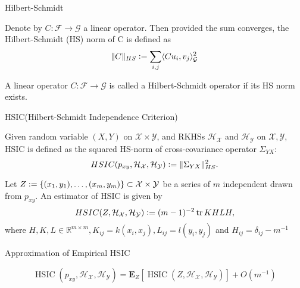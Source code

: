 \begin{frame}{Hilbert-Schmidt}
\begin{definition}
Denote by $C:\mathcal F\rightarrow \mathcal G$ a linear operator. Then provided the sum converges, the Hilbert-Schmidt (HS) norm of  C is defined as 
\begin{equation}
	\|C\|_{HS}\vcentcolon=\sum_{i,j}\langle Cu_i, v_j\rangle^2_{\mathcal G}
\end{equation}
\end{definition}

\begin{definition}
A linear operator $C:\mathcal F\rightarrow \mathcal G$ is called a Hilbert-Schmidt operator if its HS norm exists.
\end{definition}


\end{frame}


\begin{frame}{HSIC(Hilbert-Schmidt Independence Criterion)}
	\begin{definition}[HSIC]
	Given random variable $(X, Y)$ on $\mathcal X\times \mathcal Y$, and RKHSs $\mathcal H_{\mathcal X}$ and $\mathcal H_{\mathcal Y}$ on $\mathcal X, \mathcal Y$,
	HSIC is defined as the squared HS-norm of cross-covariance operator $\Sigma_{YX}$:
	\begin{equation}
		HSIC(p_{xy}, \mathcal{H_{\mathcal X}}, \mathcal{H_{\mathcal Y}}) \vcentcolon= \|\Sigma_{YX} \|_{HS}^2.
	\end{equation}
	\end{definition}
	
\begin{definition}
Let $Z\vcentcolon= \{(x_1, y_1),\dots,(x_m,y_m)\}\subset \mathcal X\times \mathcal Y$ be a series of $m$ independent drawn from $p_{xy}$. 
An estimator of HSIC is given by 
\begin{equation}
	HSIC(Z, \mathcal H_{\mathcal X}, \mathcal H_{\mathcal Y}) \vcentcolon= (m-1)^{-2}\operatorname{tr} KHLH,
\end{equation}
where $H, K, L\in \mathbb R^{m\times m}, K_{ij}=k(x_i,x_j), L_{ij}=l(y_i, y_j)$ and $H_{ij}=\delta_{ij}-m^{-1}$
\end{definition}



\end{frame}

\begin{frame}{Approximation of Empirical HSIC}
	
	
\begin{theorem}
\begin{equation}
	\operatorname{HSIC}\left(p_{x y}, \mathcal{H_{\mathcal X}}, \mathcal{H_{\mathcal Y}}\right)=\mathbf{E}_{Z}[\operatorname{HSIC}(Z, \mathcal{H_{\mathcal X}}, \mathcal{H_{\mathcal Y}})]+O\left(m^{-1}\right)
\end{equation}
\end{theorem}
\end{frame}

